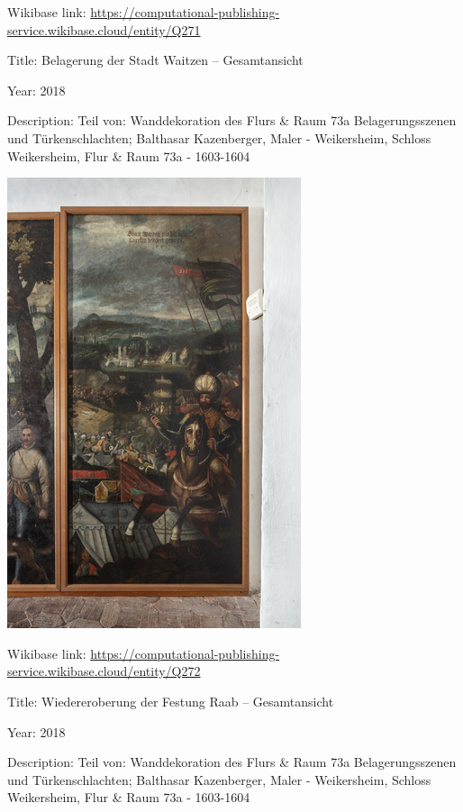 \documentclass[
  letterpaper,
]{book}
\begin{document}
Wikibase link:
\url{https://computational-publishing-service.wikibase.cloud/entity/Q271}

Title: Belagerung der Stadt Waitzen -- Gesamtansicht

Year: 2018

Description: Teil von: Wanddekoration des Flurs \& Raum 73a
Belagerungsszenen und Türkenschlachten; Balthasar Kazenberger, Maler -
Weikersheim, Schloss Weikersheim, Flur \& Raum 73a - 1603-1604

\includegraphics{paintings_files/figure-pdf/cell-3-output-34.png}

Wikibase link:
\url{https://computational-publishing-service.wikibase.cloud/entity/Q272}

Title: Wiedereroberung der Festung Raab -- Gesamtansicht

Year: 2018

Description: Teil von: Wanddekoration des Flurs \& Raum 73a
Belagerungsszenen und Türkenschlachten; Balthasar Kazenberger, Maler -
Weikersheim, Schloss Weikersheim, Flur \& Raum 73a - 1603-1604
\end{document}
